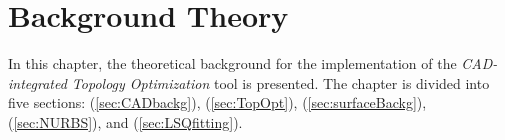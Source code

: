 \chapter{Background Theory}
\label{chapter:Background}
In this chapter, the theoretical background for the implementation of the \textit{CAD-integrated Topology Optimization} tool is presented. The chapter is divided into five sections: \emph{} (\autoref{sec:CADbackg}), \emph{} (\autoref{sec:TopOpt}), \emph{} (\autoref{sec:surfaceBackg}), \emph{} (\autoref{sec:NURBS}), and \emph{} (\autoref{sec:LSQfitting}).




%



% 






